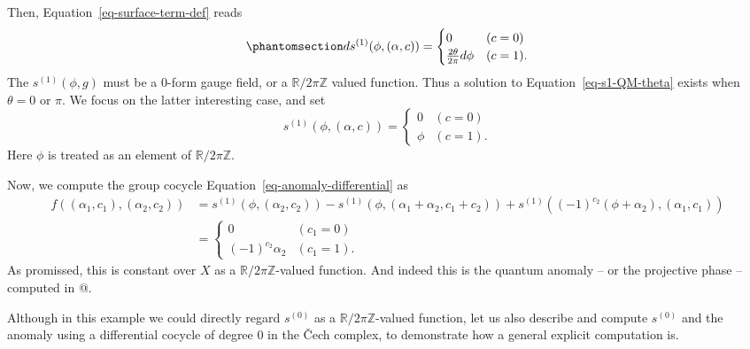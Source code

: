 \documentclass[11pt,toc=bibliography]{scrbook}
\numberwithin{equation}{section}
\begin{document}
Then, Equation~\ref{eq-surface-term-def} reads
\begin{equation}\phantomsection\label{eq-s1-QM-theta}{
ds^{(1)}(\phi,(\alpha,c)) = 
\begin{cases}
    0 & (c=0) \\
    \frac{2\theta}{2\pi} d\phi & (c=1).
\end{cases}
}\end{equation} The \(s^{(1)}(\phi,g)\) must be a 0-form gauge field, or
a \(\mathbb{R}/2\pi\mathbb{Z}\) valued function. Thus a solution to
Equation~\ref{eq-s1-QM-theta} exists when \(\theta = 0\) or \(\pi\). We
focus on the latter interesting case, and set \[
s^{(1)}(\phi,(\alpha,c)) =
\begin{cases}
    0 & (c=0) \\
    \phi & (c=1).
\end{cases}
\] Here \(\phi\) is treated as an element of
\(\mathbb{R}/2\pi\mathbb{Z}\).

Now, we compute the group cocycle Equation~\ref{eq-anomaly-differential}
as \[
\begin{aligned}
f((\alpha_1,c_1),(\alpha_2,c_2))
&= s^{(1)}(\phi,(\alpha_2,c_2))-s^{(1)}(\phi,(\alpha_1+\alpha_2,c_1+c_2)) + s^{(1)}((-1)^{c_2}(\phi+\alpha_2),(\alpha_1,c_1))\\
&= 
\begin{cases}
0 & (c_1=0)\\
(-1)^{c_2}\alpha_2 & (c_1=1).
\end{cases}
\end{aligned}
\] As promissed, this is constant over \(X\) as a
\(\mathbb{R}/2\pi\mathbb{Z}\)-valued function. And indeed this is the
quantum anomaly -- or the projective phase -- computed in
@\autocite[Appendix D.1]{Gaiotto:2017yup}.

Although in this example we could directly regard \(s^{(0)}\) as a
\(\mathbb{R}/2\pi\mathbb{Z}\)-valued function, let us also describe and
compute \(s^{(0)}\) and the anomaly using a differential cocycle of
degree 0 in the Čech complex, to demonstrate how a general explicit
computation is.
\end{document}
